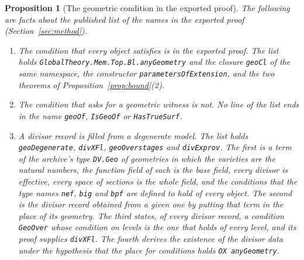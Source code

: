 \documentclass[11pt]{article}
\newtheorem{proposition}[theorem]{Proposition}
\theoremstyle{definition}
\theoremstyle{remark}
\DeclareRobustCommand{\lean}[1]{{\renewcommand{\_}{\textunderscore\allowbreak}\texttt{#1}}}
\begin{document}
\begin{proposition}[The geometric condition in the exported proof]\label{prop:compiled}
The following are facts about the published list of the names in the exported proof (Section~\ref{sec:method}).
\begin{enumerate}[leftmargin=2em,itemsep=1pt]\sloppy
\item \emph{The condition that every object satisfies is in the exported proof.} The list holds \lean{GlobalTheory.Mem.Top.Bl.anyGeometry} and the closure \lean{geoCl} of the same namespace, the constructor \lean{parametersOfExtension}, and the two theorems of Proposition~\ref{prop:bound}(2).
\item \emph{The condition that asks for a geometric witness is not.} No line of the list ends in the name \lean{geoOf}, \lean{IsGeoOf} or \lean{HasTrueSurf}.
\item \emph{A divisor record is filled from a degenerate model.} The list holds \lean{geoDegenerate}, \lean{divXFl}, \lean{geoOver\_stages} and \lean{divEx\_prov}. The first is a term of the archive's type \lean{DV.Geo} of geometries in which the varieties are the natural numbers, the function field of each is the base field, every divisor is effective, every space of sections is the whole field, and the conditions that the type names \lean{nef}, \lean{big} and \lean{bpf} are defined to hold of every object. The second is the divisor record obtained from a given one by putting that term in the place of its geometry. The third states, of every divisor record, a condition \lean{GeoOver} whose condition on levels is the one that holds of every level, and its proof supplies \lean{divXFl}. The fourth derives the existence of the divisor data under the hypothesis that the place for conditions holds \lean{OX anyGeometry}.

\end{enumerate}
\end{proposition}
\end{document}
